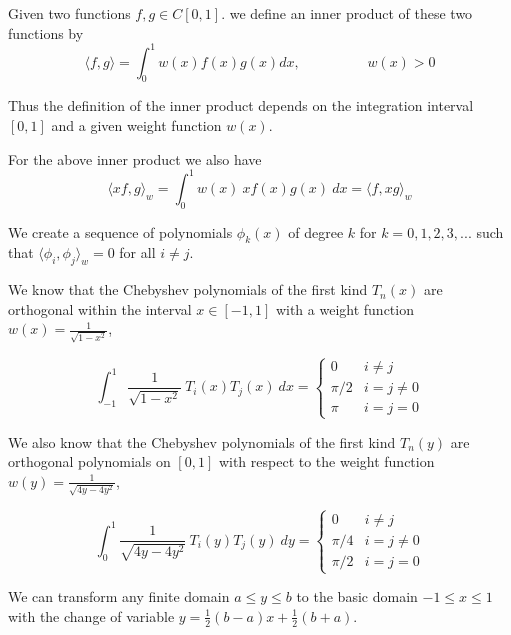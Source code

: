 \documentclass[a4paper,11pt]{report}
\begin{document}
\begin{enumerate}
\begin{itemize}
    Given two functions $f, g \in C[0, 1]$. we define an inner product of these two functions by
    \begin{equation*}
    \langle f, g \rangle = \int_{0}^{1} w(x) f(x) g(x) dx, \hspace{2cm} w(x) > 0
    \end{equation*}
        
    Thus the definition of the inner product depends on the integration interval $[0, 1]$ and a given weight function $w(x)$.

    For the above inner product we also have
    \begin{equation*}
    \langle xf, g \rangle_{w} = \int_{0}^{1} w(x)\ x f(x) g(x)\ dx = \langle f, xg \rangle_{w}
    \end{equation*}

    We create a sequence of polynomials $\phi_{k}(x)$ of degree $k$ for $k = 0, 1, 2, 3, ...$ such that
    $\langle \phi_{i}, \phi_{j} \rangle_{w} = 0$ for all $i \neq j$.

    We know that the Chebyshev polynomials of the first kind $T_{n}(x)$ are orthogonal within the interval $x \in [-1, 1]$ with a weight function 
    $w(x) = \displaystyle \frac{1}{\sqrt{1 - x^{2}}}$,

    \begin{equation*}
    \int_{-1}^{1} \frac{1}{\sqrt{1 - x^2}}\ T_{i}(x) T_{j}(x)\ dx = 
    \begin{cases}
        0 & i \neq j \\
        \pi/2 & i = j \neq 0 \\
        \pi & i = j = 0
    \end{cases}
    \end{equation*}

    We also know that the Chebyshev polynomials of the first kind $T_{n}(y)$ are orthogonal polynomials on $[0,1]$ with respect to the weight function
    $w(y) = \displaystyle \frac{1}{\sqrt{4y - 4y^2}}$,

    \begin{equation*}
    \int_{0}^{1} \frac{1}{\sqrt{4y - 4y^2}}\ T_{i}(y) T_{j}(y)\ dy = 
    \begin{cases}
        0 & i \neq j \\
        \pi/4 & i = j \neq 0 \\
        \pi/2 & i = j = 0
    \end{cases}
    \end{equation*}

    We can transform any finite domain $a \le y \le b$ to the basic domain $-1 \le x \le 1$ with the change of variable
    $y = \displaystyle \frac{1}{2} (b - a)x + \frac{1}{2} (b + a)$.


\end{itemize}
\end{enumerate}
\end{document}
